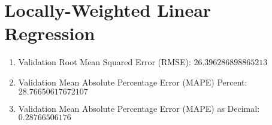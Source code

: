 \documentclass[12pt]{article}
\begin{document}
\section{Locally-Weighted Linear Regression}
\begin{enumerate}
    \item Validation Root Mean Squared Error (RMSE): $26.396286898865213$
    \item Validation Mean Absolute Percentage Error (MAPE) Percent: $28.76650617672107$
    \item Validation Mean Absolute Percentage Error (MAPE) as Decimal: $0.28766506176$
\end{enumerate}
\end{document}
